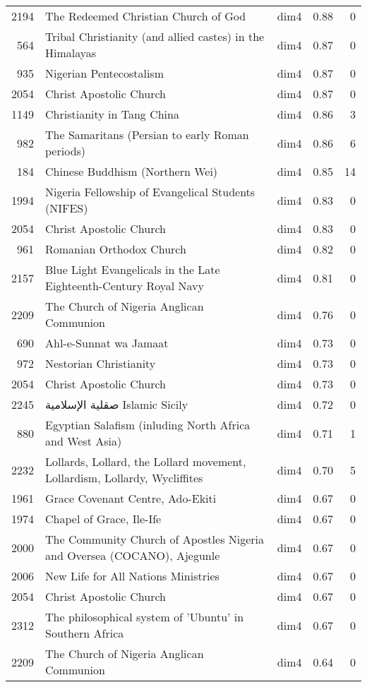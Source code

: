 \begin{tabular}{rllrr}
2194 & The Redeemed Christian Church of God & dim4 & 0.88 & 0 \\
564 & Tribal Christianity (and allied castes) in the Himalayas & dim4 & 0.87 & 0 \\
935 & Nigerian Pentecostalism & dim4 & 0.87 & 0 \\
2054 & Christ Apostolic Church & dim4 & 0.87 & 0 \\
1149 & Christianity in Tang China & dim4 & 0.86 & 3 \\
982 & The Samaritans (Persian to early Roman periods) & dim4 & 0.86 & 6 \\
184 & Chinese Buddhism (Northern Wei) & dim4 & 0.85 & 14 \\
1994 & Nigeria Fellowship of Evangelical Students (NIFES) & dim4 & 0.83 & 0 \\
2054 & Christ Apostolic Church & dim4 & 0.83 & 0 \\
961 & Romanian Orthodox Church & dim4 & 0.82 & 0 \\
2157 & Blue Light Evangelicals in the Late Eighteenth-Century Royal Navy & dim4 & 0.81 & 0 \\
2209 & The Church of Nigeria Anglican Communion & dim4 & 0.76 & 0 \\
690 & Ahl-e-Sunnat wa Jamaat & dim4 & 0.73 & 0 \\
972 & Nestorian Christianity & dim4 & 0.73 & 0 \\
2054 & Christ Apostolic Church & dim4 & 0.73 & 0 \\
2245 & صقلية الإسلامية Islamic Sicily & dim4 & 0.72 & 0 \\
880 & Egyptian Salafism (inluding North Africa and West Asia) & dim4 & 0.71 & 1 \\
2232 & Lollards, Lollard, the Lollard movement, Lollardism,  Lollardy, Wycliffites & dim4 & 0.70 & 5 \\
1961 & Grace Covenant Centre, Ado-Ekiti & dim4 & 0.67 & 0 \\
1974 & Chapel of Grace, Ile-Ife & dim4 & 0.67 & 0 \\
2000 & The Community Church of Apostles Nigeria and Oversea (COCANO), Ajegunle & dim4 & 0.67 & 0 \\
2006 & New Life for All Nations Ministries & dim4 & 0.67 & 0 \\
2054 & Christ Apostolic Church & dim4 & 0.67 & 0 \\
2312 & The philosophical system of 'Ubuntu' in Southern Africa & dim4 & 0.67 & 0 \\
2209 & The Church of Nigeria Anglican Communion & dim4 & 0.64 & 0 \\

\end{tabular}
